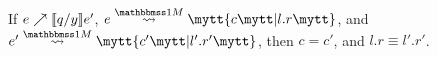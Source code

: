 \begin{figure*}
\begin{abstrsyn}
\begin{lemma} 
\label{lem:hoistCorrect}
If ${e}\nearrow \llbracket q/y \rrbracket{e'}$, $\splitone e A c {l.r}$, and $\splitone {e'} A {c'} {l'.r'}$, then $c = c'$, and $l.r \equiv l'.r'$.
\end{lemma}









\end{abstrsyn}
\end{figure*}
